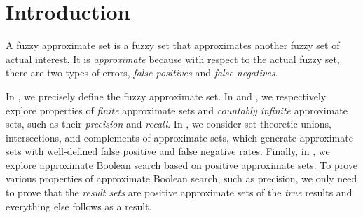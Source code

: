 \documentclass[ ../main.tex]{subfiles}
\begin{document}
\section{Introduction}
A fuzzy approximate set is a fuzzy set that approximates another fuzzy set of actual interest. It is \emph{approximate} because with respect to the actual fuzzy set, there are two types of errors, \emph{false positives} and \emph{false negatives}.

In , we precisely define the fuzzy approximate set. In  and , we respectively explore properties of \emph{finite} approximate sets and \emph{countably infinite} approximate sets, such as their \emph{precision} and \emph{recall}. In , we consider set-theoretic unions, intersections, and complements of approximate sets, which generate approximate sets with well-defined false positive and false negative rates. Finally, in , we explore approximate Boolean search based on positive approximate sets. To prove various properties of approximate Boolean search, such as precision, we only need to prove that the \emph{result sets} are positive approximate sets of the \emph{true} results and everything else follows as a result.
\end{document}
